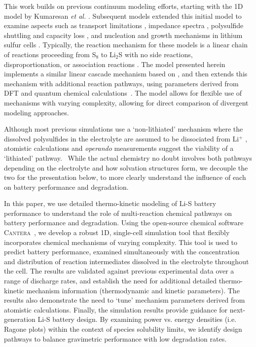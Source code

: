 \documentclass{elsarticle}
\begin{document}
This work builds on previous continuum modeling efforts, starting with the 1D model by Kumaresan \textit{et al.} \cite{Kumaresan_2008}. Subsequent models extended this initial model to examine aspects such as transport limitations \cite{ZHANG2016502}, impedance spectra \cite{FRONCZEK2013183}, polysulfide shuttling and capacity loss \cite{HOFMANN2014300}, and nucleation and growth mechanisms in lithium sulfur cells \cite{REN2016115, DANNER2019134719}. Typically, the reaction mechanism for these models is a linear chain of reactions proceeding from S$_8$ to Li$_2$S with no side reactions, disproportionation, or association reactions \cite{FRONCZEK2013183, Kumaresan_2008, ZHANG2016502, HOFMANN2014300, REN2016115}. The model presented herein implements a similar linear cascade mechanism based on \cite{Neidhardt_2012}, and then extends this mechanism with additional reaction pathways, using parameters derived from DFT and quantum chemical calculations~\cite{assary2014, kuzmina2019}. The model allows for flexible use of mechanisms with varying complexity, allowing for direct comparison of divergent modeling approaches.

Although most previous simulations use a `non-lithiated' mechanism where the dissolved polysulfides in the electrolyte are assumed to be dissociated from Li$^+$ \cite{FRONCZEK2013183, Kumaresan_2008, ZHANG2016502, HOFMANN2014300, REN2016115}, atomistic calculations and \textit{operando} measurements suggest the viability of a `lithiated' pathway.~\cite{assary2014,kuzmina2019,SAQIB2017266}  While the actual chemistry no doubt involves both pathways depending on the electrolyte and how solvation structures form, we decouple the two for the presentation below, to more clearly understand the influence of each on battery performance and degradation.

In this paper, we use detailed thermo-kinetic modeling of Li-S battery performance to understand the role of multi-reaction chemical pathways on battery performance and degradation.  Using the open-source chemical software \textsc{Cantera}~\cite{cantera}, we develop a robust 1D, single-cell simulation tool that flexibly incorporates chemical mechanisms of varying complexity.  This tool is used to predict battery performance, examined simultaneously with the concentration and distribution of reaction intermediates dissolved in the electrolyte throughout the cell. The results are validated against previous experimental data over a range of discharge rates, and establish the need for additional detailed thermo-kinetic mechanism information (thermodynamic and kinetic parameters). The results also demonstrate the need to `tune' mechanism parameters derived from atomistic calculations.  Finally, the simulation results provide guidance for next-generation Li-S battery design.  By examining power vs. energy densities (i.e. Ragone plots) within the context of species solubility limits, we identify design pathways to balance gravimetric performance with low degradation rates.
\end{document}
